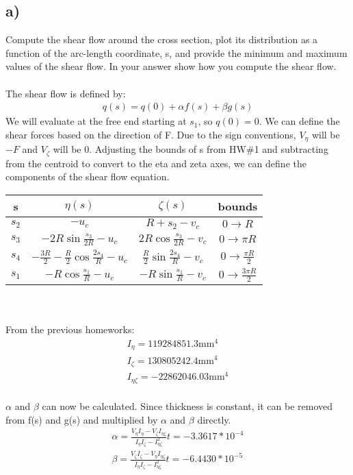 \documentclass[12 pt]{article}
\begin{document}
\subsection*{a)}
Compute the shear flow around the cross section, plot its distribution as a function of the arc-length coordinate, s,
and provide the minimum and maximum values of the shear flow. In your answer show how you compute the shear flow. \\ \\
The shear flow is defined by:
\begin{align*}
    q(s)=q(0)+\alpha f(s) + \beta g(s)
\end{align*}
We will evaluate at the free end starting at $s_1$, so $q(0)=0$. We can define the shear forces based on the direction
of F. Due to the sign conventions, $V_{\eta}$ will be $-F$ and $V_{\zeta}$ will be 0. Adjusting the bounds of s from
HW\#1 and subtracting from the centroid to convert to the eta and zeta axes, we can define the components of the shear
flow equation. \\
\begin{tabular}{|c|c|c|c|}
    \hline
    s & $\eta(s)$ & $\zeta(s)$ & bounds \\ \hline
    $s_2$ & $-u_c$ & $R+s_2-v_c$ & $0 \rightarrow R$ \\
    $s_3$ & $-2R\sin{\frac{s_3}{2R}}-u_c$ & $2R\cos{\frac{s_3}{2R}}-v_c$ & $0 \rightarrow \pi R$ \\
    $s_4$ & $-\frac{3R}{2} - \frac{R}{2}\cos{\frac{2s_4}{R}}-u_c$ & $\frac{R}{2}\sin{\frac{2s_4}{R}}-v_c$ & $0 \rightarrow
    \frac{\pi R}{2}$
    \\
    $s_1$ & $-R\cos{\frac{s_1}{R}}-u_c$ & $-R\sin{\frac{s_1}{R}}-v_c$ & $0 \rightarrow \frac{3\pi R}{2}$ \\
    \hline
\end{tabular} \\ \\
From the previous homeworks:
\begin{align*}
    I_{\eta} = 119284851.3\textrm{mm}^4 \\
    I_{\zeta}=130805242.4\textrm{mm}^4\\
    I_{\eta \zeta}=-22862046.03\textrm{mm}^4
\end{align*} \\
$\alpha$ and $\beta$ can now be calculated. Since thickness is constant, it can be removed from f(s) and g(s) and multiplied
by $\alpha$ and $\beta$ directly.
\begin{align*}
    \alpha = \frac{V_{\eta}I_{\eta}-V_{\zeta}I_{\eta \zeta}}{I_{\eta}I_{\zeta}-I_{\eta \zeta}^2}t = -3.3617*10^{-4} \\
    \beta = \frac{V_{\zeta}I_{\zeta}-V_{\eta}I_{\eta \zeta}}{I_{\eta}I_{\zeta}-I_{\eta \zeta}^2}t = -6.4430*10^{-5}
\end{align*} \\
\end{document}
